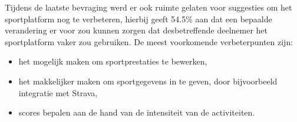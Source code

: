 Tijdens de laatste bevraging werd er ook ruimte gelaten voor suggesties om het sportplatform nog te verbeteren, hierbij geeft 54.5\% aan dat een bepaalde verandering er voor zou kunnen zorgen dat desbetreffende deelnemer het sportplatform vaker zou gebruiken. De meest voorkomende verbeterpunten zijn:

\begin{itemize}
  \item het mogelijk maken om sportprestaties te bewerken,
  \item het makkelijker maken om sportgegevens in te geven, door bijvoorbeeld integratie met Strava,
  \item scores bepalen aan de hand van de intensiteit van de activiteiten.
\end{itemize}